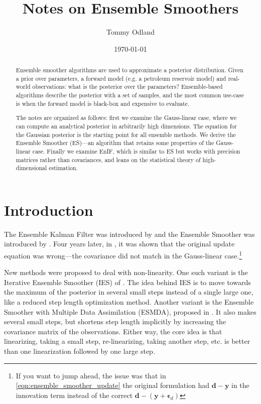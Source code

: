 \documentclass[12pt, a4paper]{article}
\title{Notes on Ensemble Smoothers}
\author{Tommy Odland}
\date{\today}
\theoremstyle{spaced}
\theoremstyle{spaceddef}
\numberwithin{equation}{section}
\begin{document}
\maketitle

\begin{abstract}
    \noindent

Ensemble smoother algorithms are used to approximate a posterior distribution.
Given a prior over parameters, a forward model (e.g. a petroleum reservoir model) and real-world observations: what is the posterior over the parameters?
Ensemble-based algorithms describe the posterior with a set of samples, and the most common use-case is when the forward model is black-box and expensive to evaluate.

The notes are organized as follows: first we examine the Gauss-linear case, where we can compute an analytical posterior in arbitrarily high dimensions.
The equation for the Gaussian posterior is the starting point for all ensemble methods.
We derive the Ensemble Smoother (ES)---an algorithm that retains some properties of the Gauss-linear case.
Finally we examine EnIF, which is similar to ES but works with precision matrices rather than covariances, and leans on the statistical theory of high-dimensional estimation.
\end{abstract}

\tableofcontents

\section{Introduction}
\label{sec:introduction}

The Ensemble Kalman Filter was introduced by \citet{Evensen1994} and the Ensemble Smoother was introduced by \citet{VanLeeuwen1996}.
Four years later, in \citet{Burgers1998}, it was shown that the original update equation was wrong---the covariance did not match in the Gauss-linear case.\footnote{If you want to jump ahead, the issue was that in \cref{eqn:ensemble_smoother_update} the original formulation had $\bm{d} - \bm{y}$ in the innovation term instead of the correct $\bm{d} - (\bm{y} + \bm{\epsilon}_d)$}

New methods were proposed to deal with non-linearity.
One such variant is the
Iterative Ensemble Smoother (IES) of \citet{chen2012ensemble,chen2013levenberg}.
The idea behind IES is to move towards the maximum of the posterior in several small steps instead of a single large one, like a reduced step length optimization method.
Another variant is the Ensemble Smoother with Multiple Data Assimilation (ESMDA), proposed in \citet{emerick2013ensemble}.
It also makes several small steps, but shortens step length implicitly by increasing the covariance matrix of the observations.
Either way, the core idea is that linearizing, taking a small step, re-linearizing, taking another step, etc. is better than one linearization followed by one large step.
\end{document}
